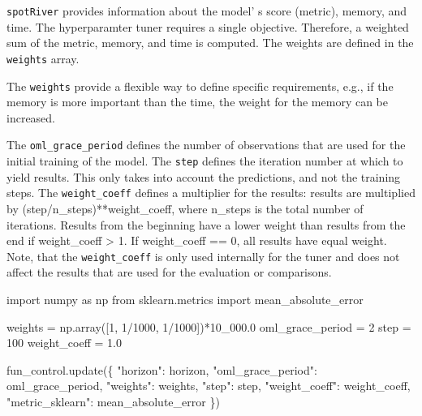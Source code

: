 \documentclass[
  letterpaper,
  DIV=11,
  numbers=noendperiod]{scrreprt}
\newenvironment{Shaded}{\begin{snugshade}}{\end{snugshade}}
\newcommand{\DecValTok}[1]{\textcolor[rgb]{0.68,0.00,0.00}{#1}}
\newcommand{\FloatTok}[1]{\textcolor[rgb]{0.68,0.00,0.00}{#1}}
\newcommand{\ImportTok}[1]{\textcolor[rgb]{0.00,0.46,0.62}{#1}}
\newcommand{\NormalTok}[1]{\textcolor[rgb]{0.00,0.23,0.31}{#1}}
\newcommand{\OperatorTok}[1]{\textcolor[rgb]{0.37,0.37,0.37}{#1}}
\newcommand{\StringTok}[1]{\textcolor[rgb]{0.13,0.47,0.30}{#1}}
\begin{document}
\texttt{spotRiver} provides information about the model' s score
(metric), memory, and time. The hyperparamter tuner requires a single
objective. Therefore, a weighted sum of the metric, memory, and time is
computed. The weights are defined in the \texttt{weights} array.

\begin{tcolorbox}[enhanced jigsaw, left=2mm, toprule=.15mm, colframe=quarto-callout-note-color-frame, leftrule=.75mm, title=\textcolor{quarto-callout-note-color}{\faInfo}\hspace{0.5em}{Note: Weights}, toptitle=1mm, opacitybacktitle=0.6, arc=.35mm, titlerule=0mm, opacityback=0, bottomtitle=1mm, coltitle=black, rightrule=.15mm, colback=white, colbacktitle=quarto-callout-note-color!10!white, breakable, bottomrule=.15mm]

The \texttt{weights} provide a flexible way to define specific
requirements, e.g., if the memory is more important than the time, the
weight for the memory can be increased.

\end{tcolorbox}

The \texttt{oml\_grace\_period} defines the number of observations that
are used for the initial training of the model. The \texttt{step}
defines the iteration number at which to yield results. This only takes
into account the predictions, and not the training steps. The
\texttt{weight\_coeff} defines a multiplier for the results: results are
multiplied by (step/n\_steps)**weight\_coeff, where n\_steps is the
total number of iterations. Results from the beginning have a lower
weight than results from the end if weight\_coeff \textgreater{} 1. If
weight\_coeff == 0, all results have equal weight. Note, that the
\texttt{weight\_coeff} is only used internally for the tuner and does
not affect the results that are used for the evaluation or comparisons.

\begin{Shaded}
\begin{Highlighting}[]
\ImportTok{import}\NormalTok{ numpy }\ImportTok{as}\NormalTok{ np}
\ImportTok{from}\NormalTok{ sklearn.metrics }\ImportTok{import}\NormalTok{ mean\_absolute\_error}

\NormalTok{weights }\OperatorTok{=}\NormalTok{ np.array([}\DecValTok{1}\NormalTok{, }\DecValTok{1}\OperatorTok{/}\DecValTok{1000}\NormalTok{, }\DecValTok{1}\OperatorTok{/}\DecValTok{1000}\NormalTok{])}\OperatorTok{*}\FloatTok{10\_000.0}
\NormalTok{oml\_grace\_period }\OperatorTok{=} \DecValTok{2}
\NormalTok{step }\OperatorTok{=} \DecValTok{100}
\NormalTok{weight\_coeff }\OperatorTok{=} \FloatTok{1.0}

\NormalTok{fun\_control.update(\{}
               \StringTok{"horizon"}\NormalTok{: horizon,}
               \StringTok{"oml\_grace\_period"}\NormalTok{: oml\_grace\_period,}
               \StringTok{"weights"}\NormalTok{: weights,}
               \StringTok{"step"}\NormalTok{: step,}
               \StringTok{"weight\_coeff"}\NormalTok{: weight\_coeff,}
               \StringTok{"metric\_sklearn"}\NormalTok{: mean\_absolute\_error}
\NormalTok{               \})}
\end{Highlighting}
\end{Shaded}
\end{document}
